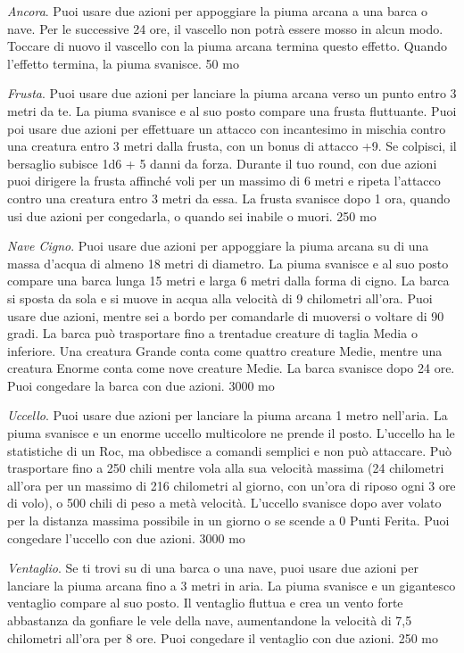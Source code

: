 \begin{multicols}{2}
\emph{Ancora}. Puoi usare due azioni per appoggiare la piuma arcana a una barca o nave. Per le successive 24 ore, il vascello non potrà essere mosso in alcun modo. Toccare di nuovo il vascello con la piuma arcana termina questo effetto. Quando l'effetto termina, la piuma svanisce. 50 mo

\emph{Frusta}. Puoi usare due azioni per lanciare la piuma arcana verso un punto entro 3 metri da te. La piuma svanisce e al suo posto compare una frusta fluttuante. Puoi poi usare due azioni per effettuare un attacco con incantesimo in mischia contro una creatura entro 3 metri dalla frusta, con un bonus di attacco +9. Se colpisci, il bersaglio subisce 1d6 + 5 danni da forza. Durante il tuo round, con due azioni puoi dirigere la frusta affinché voli per un massimo di 6 metri e ripeta l'attacco contro una creatura entro 3 metri da essa. La frusta svanisce dopo 1 ora, quando usi due azioni per congedarla, o quando sei inabile o muori. 250 mo

\emph{Nave Cigno}. Puoi usare due azioni per appoggiare la piuma arcana su di una massa d'acqua di almeno 18 metri di diametro. La piuma svanisce e al suo posto compare una barca lunga 15 metri e larga 6 metri dalla forma di cigno. La barca si sposta da sola e si muove in acqua alla velocità di 9 chilometri all'ora. Puoi usare due azioni, mentre sei a bordo per comandarle di muoversi o voltare di 90 gradi. La barca può trasportare fino a trentadue creature di taglia Media o inferiore. Una creatura Grande conta come quattro creature Medie, mentre una creatura Enorme conta come nove creature Medie. La barca svanisce dopo 24 ore. Puoi congedare la barca con due azioni. 3000 mo

\emph{Uccello}. Puoi usare due azioni per lanciare la piuma arcana 1 metro nell'aria. La piuma svanisce e un enorme uccello multicolore ne prende il posto. L'uccello ha le statistiche di un Roc, ma obbedisce a comandi semplici e non può attaccare. Può trasportare fino a 250 chili mentre vola alla sua velocità massima (24 chilometri all'ora per un massimo di 216 chilometri al giorno, con un'ora di riposo ogni 3 ore di volo), o 500 chili di peso a metà velocità. L'uccello svanisce dopo aver volato per la distanza massima possibile in un giorno o se scende a 0 Punti Ferita. Puoi congedare l'uccello con due azioni. 3000 mo

\emph{Ventaglio}. Se ti trovi su di una barca o una nave, puoi usare due azioni per lanciare la piuma arcana fino a 3 metri in aria. La piuma svanisce e un gigantesco ventaglio compare al suo posto. Il ventaglio fluttua e crea un vento forte abbastanza da gonfiare le vele della nave, aumentandone la velocità di 7,5 chilometri all'ora per 8 ore. Puoi congedare il ventaglio con due azioni. 250 mo


\end{multicols}
